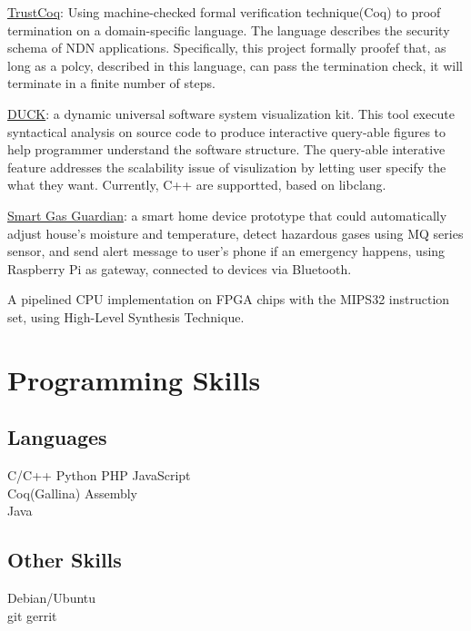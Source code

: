 \documentclass[]{deedy-resume-openfont}
\begin{document}
\begin{tightemize}
\item \href{https://github.com/Stumble/TrustCoq}{TrustCoq}: Using machine-checked formal verification technique(Coq) to proof termination on a domain-specific language. The language describes the security schema of NDN applications. Specifically, this project formally proofef that, as long as a polcy, described in this language, can pass the termination check, it will terminate in a finite number of steps.
\item \href{https://github.com/Stumble/duck}{DUCK}: a dynamic universal software system visualization kit. This tool execute syntactical analysis on source code to produce interactive query-able figures to help programmer understand the software structure. The query-able interative feature addresses the scalability issue of visulization by letting user specify the what they want. Currently, C++ are supportted, based on libclang.
\item \href{https://github.com/Stumble/smartGG}{Smart Gas Guardian}: a smart home device prototype that could automatically adjust house’s moisture and temperature, detect hazardous gases using MQ series sensor, and send alert message to user’s phone if an emergency happens, using Raspberry Pi as gateway, connected to devices via Bluetooth.
\item A pipelined CPU implementation on FPGA chips with the MIPS32 instruction set, using High-Level Synthesis Technique.
\end{tightemize}




\section{Programming Skills}
\begin{minipage}[t]{.6\textwidth}
\subsection{Languages}
C/C++ \textbullet{} Python \textbullet{} PHP \textbullet{} JavaScript \\
Coq(Gallina) \textbullet{} Assembly \textbullet{} \\
Java

\sectionsep
\end{minipage}
\hfill
\begin{minipage}[t]{.35\textwidth}
\subsection{Other Skills}
Debian/Ubuntu\\
git \textbullet{} gerrit\\
\end{minipage}

\end{document}
